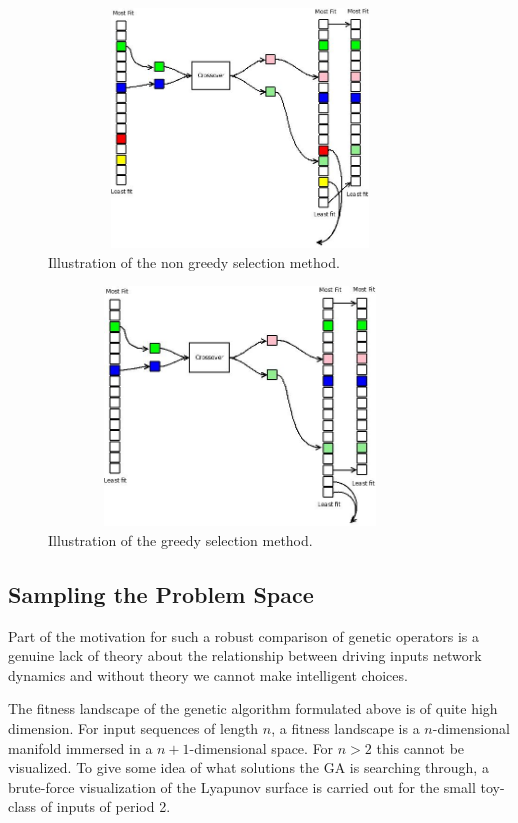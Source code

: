 \documentclass[12pt]{article}
\begin{document}
\begin{figure}[htb]
\begin{center}
\includegraphics[height=2.5in,width=4.0in]{images/non_greedy_selection.jpeg}
\caption{Illustration of the non greedy selection method.}
\end{center}
\end{figure}
\begin{figure}[htb]
\begin{center}
\includegraphics[height=2.5in,width=4.0in]{images/greedy_selection.jpeg}
\caption{Illustration of the greedy selection method.}
\end{center}
\end{figure}

\clearpage

\subsection{Sampling the Problem Space}
Part of the motivation for such a robust comparison of genetic operators is
a genuine lack of theory about the relationship between driving inputs
network dynamics and without theory we cannot make intelligent choices.

The fitness landscape of the genetic algorithm formulated above is of quite
high dimension.  For input sequences of length $n$, a fitness landscape is
a $n$-dimensional manifold immersed in a $n+1$-dimensional space.  For $n > 2$
this cannot be visualized.  To give some idea of what solutions the GA is
searching through, a brute-force visualization of the Lyapunov surface is
carried out for the small toy-class of inputs of period 2.
\end{document}
